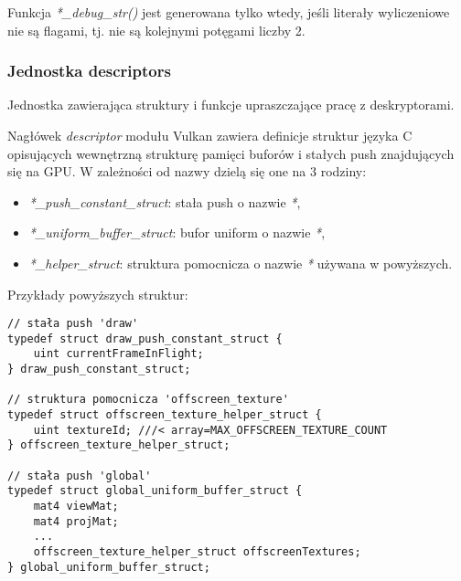 Funkcja \textit{*\_debug\_str()} jest generowana tylko wtedy, jeśli literały wyliczeniowe nie są flagami, tj. nie są kolejnymi potęgami liczby 2.


\subsubsection{Jednostka descriptors}
Jednostka zawierająca struktury i funkcje upraszczające pracę z deskryptorami.

Nagłówek \textit{descriptor} modułu Vulkan zawiera definicje struktur języka C opisujących wewnętrzną strukturę pamięci buforów i stałych push znajdujących się na GPU.
W zależności od nazwy dzielą się one na 3 rodziny:
\begin{itemize}
	\item \textit{*\_push\_constant\_struct}: stała push o nazwie \textit{*},
	\item \textit{*\_uniform\_buffer\_struct}: bufor uniform o nazwie \textit{*},
	\item \textit{*\_helper\_struct}: struktura pomocnicza o nazwie \textit{*} używana w powyższych.
\end{itemize}
Przykłady powyższych struktur:
\lstset{language=C}
\begin{lstlisting}
// stała push 'draw'
typedef struct draw_push_constant_struct {
	uint currentFrameInFlight;
} draw_push_constant_struct;

// struktura pomocnicza 'offscreen_texture'
typedef struct offscreen_texture_helper_struct {
	uint textureId; ///< array=MAX_OFFSCREEN_TEXTURE_COUNT
} offscreen_texture_helper_struct;

// stała push 'global'
typedef struct global_uniform_buffer_struct {
	mat4 viewMat;
	mat4 projMat;
	...
	offscreen_texture_helper_struct offscreenTextures;
} global_uniform_buffer_struct;
\end{lstlisting}

